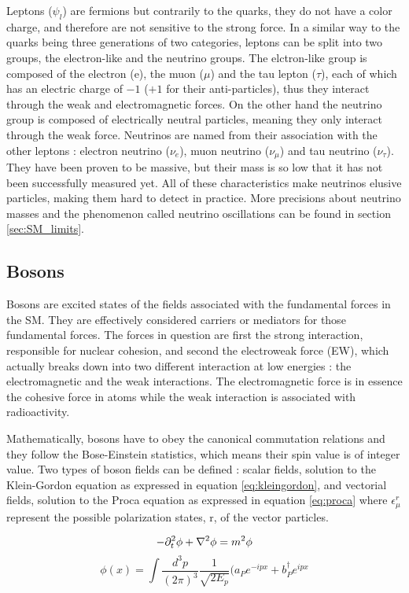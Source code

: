 Leptons ($\psi_l$) are fermions but contrarily to the quarks, they do not have a color charge, and therefore are not sensitive to the strong force. In a similar way to the quarks being three generations of two categories, leptons can be split into two groups, the electron-like and the neutrino groups. The elctron-like group is composed of the electron (e), the muon ($\mu$) and the tau lepton ($\tau$), each of which has an electric charge of $-1$ ($+1$ for their anti-particles), thus they interact through the weak and electromagnetic forces. On the other hand the neutrino group is composed of electrically neutral particles, meaning they only interact through the weak force. Neutrinos are named from their association with the other leptons : electron neutrino ($\nu_e$), muon neutrino ($\nu_{\mu}$) and tau neutrino ($\nu_{\tau}$). They have been proven to be massive, but their mass is so low that it has not been successfully measured yet. All of these characteristics make neutrinos elusive particles, making them hard to detect in practice. More precisions about neutrino masses and the phenomenon called neutrino oscillations can be found in section \ref{sec:SM_limits}.

\subsection{Bosons}

Bosons are excited states of the fields associated with the fundamental forces in the SM. They are effectively considered carriers or mediators for those fundamental forces. The forces in question are first the strong interaction, responsible for nuclear cohesion, and second the electroweak force (EW), which actually breaks down into two different interaction at low energies : the electromagnetic and the weak interactions. The electromagnetic force is in essence the cohesive force in atoms while the weak interaction is associated with radioactivity.

Mathematically, bosons have to obey the canonical commutation relations and they follow the Bose-Einstein statistics, which means their spin value is of integer value. Two types of boson fields can be defined : scalar fields, solution to the Klein-Gordon equation as expressed in equation \ref{eq:kleingordon}, and vectorial fields, solution to the Proca equation as expressed in equation \ref{eq:proca} where $\epsilon_{\mu}^{r}$ represent the possible polarization states, r, of the vector particles.

\begin{equation}
    -\partial_t^2 \phi + \nabla^2 \phi = m^2 \phi \newline
    \label{eq:kleingordon}
\end{equation}
\begin{equation}
    \phi(x) = \int \frac{d^3 p}{(2\pi)^3} \frac{1}{\sqrt{2E_p}} \big( a_P e^{-ipx} + b_P^{\dagger} e^{ipx}
\end{equation}

